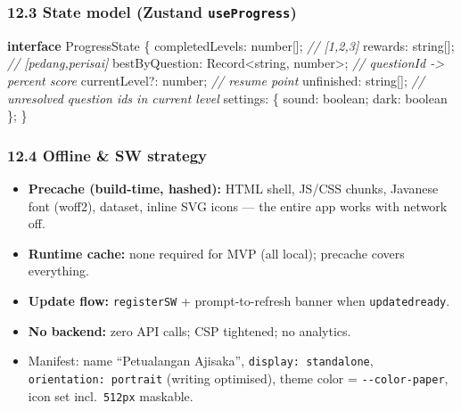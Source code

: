 \documentclass[
  11pt,
]{article}
\newenvironment{Shaded}{}{}
\newcommand{\BuiltInTok}[1]{\textcolor[rgb]{0.00,0.50,0.00}{#1}}
\newcommand{\CommentTok}[1]{\textcolor[rgb]{0.38,0.63,0.69}{\textit{#1}}}
\newcommand{\DataTypeTok}[1]{\textcolor[rgb]{0.56,0.13,0.00}{#1}}
\newcommand{\KeywordTok}[1]{\textcolor[rgb]{0.00,0.44,0.13}{\textbf{#1}}}
\newcommand{\NormalTok}[1]{#1}
\newcommand{\OperatorTok}[1]{\textcolor[rgb]{0.40,0.40,0.40}{#1}}
\providecommand{\tightlist}{%
  \setlength{\itemsep}{0pt}\setlength{\parskip}{0pt}}
\begin{document}
\subsubsection{\texorpdfstring{12.3 State model (Zustand
\texttt{useProgress})}{12.3 State model (Zustand useProgress)}}\label{state-model-zustand-useprogress}

\begin{Shaded}
\begin{Highlighting}[]
\KeywordTok{interface}\NormalTok{ ProgressState \{}
\NormalTok{  completedLevels}\OperatorTok{:} \DataTypeTok{number}\NormalTok{[]}\OperatorTok{;}        \CommentTok{// [1,2,3]}
\NormalTok{  rewards}\OperatorTok{:} \DataTypeTok{string}\NormalTok{[]}\OperatorTok{;}                \CommentTok{// [\textquotesingle{}pedang\textquotesingle{},\textquotesingle{}perisai\textquotesingle{}]}
\NormalTok{  bestByQuestion}\OperatorTok{:} \BuiltInTok{Record}\OperatorTok{\textless{}}\DataTypeTok{string}\OperatorTok{,} \DataTypeTok{number}\OperatorTok{\textgreater{};} \CommentTok{// questionId {-}\textgreater{} percent score}
\NormalTok{  currentLevel}\OperatorTok{?:} \DataTypeTok{number}\OperatorTok{;}            \CommentTok{// resume point}
\NormalTok{  unfinished}\OperatorTok{:} \DataTypeTok{string}\NormalTok{[]}\OperatorTok{;}             \CommentTok{// unresolved question ids in current level}
\NormalTok{  settings}\OperatorTok{:}\NormalTok{ \{ sound}\OperatorTok{:} \DataTypeTok{boolean}\OperatorTok{;}\NormalTok{ dark}\OperatorTok{:} \DataTypeTok{boolean}\NormalTok{ \}}\OperatorTok{;}
\NormalTok{\}}
\end{Highlighting}
\end{Shaded}

\subsubsection{12.4 Offline \& SW strategy}\label{offline-sw-strategy}

\begin{itemize}
\tightlist
\item
  \textbf{Precache (build-time, hashed):} HTML shell, JS/CSS chunks,
  Javanese font (woff2), dataset, inline SVG icons --- the entire app
  works with network off.
\item
  \textbf{Runtime cache:} none required for MVP (all local); precache
  covers everything.
\item
  \textbf{Update flow:} \texttt{registerSW} + prompt-to-refresh banner
  when \texttt{updatedready}.
\item
  \textbf{No backend:} zero API calls; CSP tightened; no analytics.
\item
  Manifest: name ``Petualangan Ajisaka'', \texttt{display:\ standalone},
  \texttt{orientation:\ portrait} (writing optimised), theme color =
  \texttt{-\/-color-paper}, icon set incl.~\texttt{512px} maskable.
\end{itemize}
\end{document}
